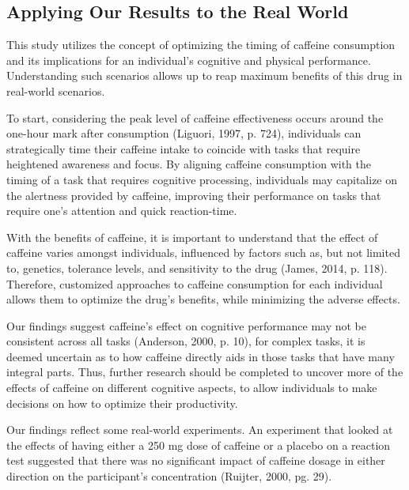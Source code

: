 \documentclass[11pt,a4paper,twoside]{tau-book}
\begin{document}
\subsection{Applying Our Results to the Real World}
This study utilizes the concept of optimizing the timing of caffeine consumption and its implications for an individual's cognitive and physical performance. Understanding such scenarios allows up to reap maximum benefits of this drug in real-world scenarios.

To start, considering the peak level of caffeine effectiveness occurs around the one-hour mark after consumption \cite{Liguori1997} (Liguori, 1997, p. 724), individuals can strategically time their caffeine intake to coincide with tasks that require heightened awareness and focus. By aligning caffeine consumption with the timing of a task that requires cognitive processing, individuals may capitalize on the alertness provided by caffeine, improving their performance on tasks that require one's attention and quick reaction-time.

With the benefits of caffeine, it is important to understand that the effect of caffeine varies amongst individuals, influenced by factors such as, but not limited to, genetics, tolerance levels, and sensitivity to the drug \cite{James2014} (James, 2014, p. 118). Therefore, customized approaches to caffeine consumption for each individual allows them to optimize the drug's benefits, while minimizing the adverse effects.

Our findings suggest caffeine's effect on cognitive performance may not be consistent across all tasks \cite{Anderson2000} (Anderson, 2000, p. 10), for complex tasks, it is deemed uncertain as to how caffeine directly aids in those tasks that have many integral parts. Thus, further research should be completed to uncover more of the effects of caffeine on different cognitive aspects, to allow individuals to make decisions on how to optimize their productivity.

Our findings reflect some real-world experiments. An experiment that looked at the effects of having either a 250 mg dose of caffeine or a placebo on a reaction test suggested that there was no significant impact of caffeine dosage in either direction on the participant's concentration \cite{Ruijter2000} (Ruijter, 2000, pg. 29). 
\end{document}
